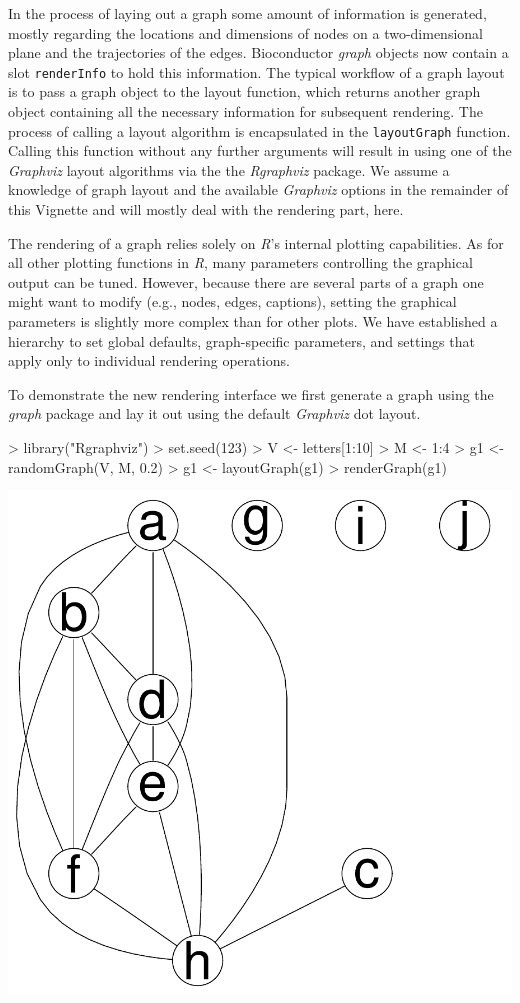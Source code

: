 \documentclass{article}
\newcommand{\Rfunction}[1]{{\texttt{#1}}}
\newcommand{\Rpackage}[1]{{\textit{#1}}}
\newcommand{\Robject}[1]{{\texttt{#1}}}
\newcommand{\Rclass}[1]{{\textit{#1}}}
\newcommand{\R}[0]{{\textit{R}}}
\begin{document}
In the process of laying out a graph some amount of information is
generated, mostly regarding the locations and dimensions of nodes on a
two-dimensional plane and the trajectories of the edges. Bioconductor
\Rclass{graph} objects now contain a slot \Robject{renderInfo} to hold
this information. The typical workflow of a graph layout is to pass a
graph object to the layout function, which returns another graph
object containing all the necessary information for subsequent
rendering. The process of calling a layout algorithm is encapsulated
in the \Rfunction{layoutGraph} function. Calling this function without
any further arguments will result in using one of the \textit{Graphviz}
layout algorithms via the the \Rpackage{Rgraphviz} package. We assume
a knowledge of graph layout and the available \textit{Graphviz}
options in the remainder of this Vignette and will mostly deal with the
rendering part, here.

The rendering of a graph relies solely on \R{}'s internal plotting
capabilities. As for all other plotting functions in \R{}, many
parameters controlling the graphical output can be tuned. However,
because there are several parts of a graph one might want
to modify (e.g., nodes, edges, captions), setting the graphical
parameters is slightly more complex than for other plots. We have
established a hierarchy to set global defaults,
graph-specific parameters, and settings that apply only to
individual rendering operations.


To demonstrate the new rendering interface we first generate a graph
using the \Rpackage{graph} package and lay it out using the default
\textit{Graphviz} dot layout.
%
\begin{Schunk}
\begin{Sinput}
> library("Rgraphviz")
> set.seed(123)
> V <- letters[1:10]
> M <- 1:4
> g1 <- randomGraph(V, M, 0.2)
> g1 <- layoutGraph(g1)
> renderGraph(g1)
\end{Sinput}
\end{Schunk}
\includegraphics{newRgraphvizInterface-createGraph1}
\end{document}
